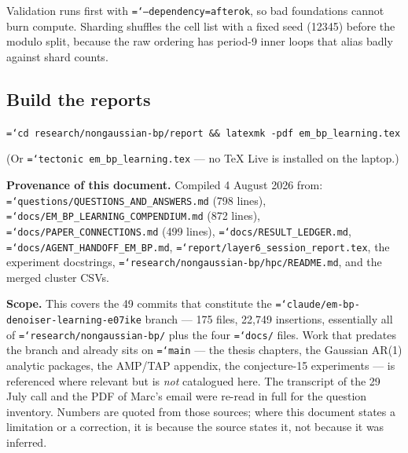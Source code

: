 \documentclass[11pt,a4paper]{article}
\newcommand{\code}[1]{\texttt{\small\hyphenchar\font=`\-\relax #1}}
\begin{document}
\noindent
Validation runs first with \code{--dependency=afterok}, so bad foundations cannot burn
compute. Sharding shuffles the cell list with a fixed seed (12345) before the modulo split,
because the raw ordering has period-9 inner loops that alias badly against shard counts.

\subsection{Build the reports}

\begin{keybox}
\code{cd research/nongaussian-bp/report \&\& latexmk -pdf em\_bp\_learning.tex}
\end{keybox}

\noindent
(Or \code{tectonic em\_bp\_learning.tex} --- no TeX Live is installed on the laptop.)

\vspace{2em}
\begin{keybox}
\textbf{Provenance of this document.} Compiled 4 August 2026 from:
\code{questions/QUESTIONS\_AND\_ANSWERS.md} (798 lines),
\code{docs/EM\_BP\_LEARNING\_COMPENDIUM.md} (872 lines),
\code{docs/PAPER\_CONNECTIONS.md} (499 lines),
\code{docs/RESULT\_LEDGER.md}, \code{docs/AGENT\_HANDOFF\_EM\_BP.md},
\code{report/layer6\_session\_report.tex}, the experiment docstrings,
\code{research/nongaussian-bp/hpc/README.md}, and the merged cluster CSVs.

\medskip
\textbf{Scope.} This covers the 49 commits that constitute the
\code{claude/em-bp-denoiser-learning-e07ike} branch --- 175 files, 22{,}749 insertions,
essentially all of \code{research/nongaussian-bp/} plus the four \code{docs/} files. Work
that predates the branch and already sits on \code{main} --- the thesis chapters, the
Gaussian AR(1) analytic packages, the AMP/TAP appendix, the conjecture-15 experiments --- is
referenced where relevant but is \emph{not} catalogued here.
The transcript of the 29 July call and the PDF of Marc's email were re-read in full for the
question inventory. Numbers are quoted from those sources; where this document states a
limitation or a correction, it is because the source states it, not because it was inferred.
\end{keybox}
\end{document}
